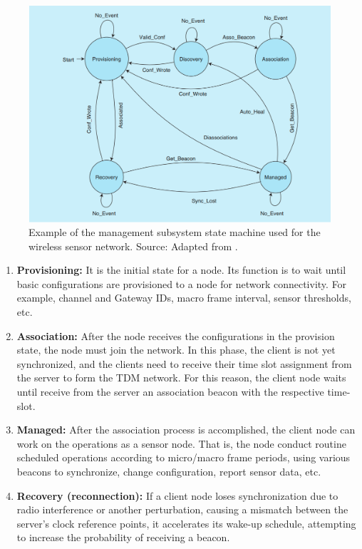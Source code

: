 \documentclass[journal]{IEEEtran}	%
\begin{document}
\begin{figure}[!t]
\centering
\includegraphics[width=0.95\columnwidth]{fig6.png}
\caption{Example of the management subsystem state machine used for the wireless sensor network. Source: Adapted from \cite{williams2017weaving}.}
\label{fig:state_machine}
\end{figure}

\begin{enumerate}
\item \textbf{Provisioning:} It is the initial state for a node. Its function is to wait until basic configurations are provisioned to a node for network connectivity. For example, channel and Gateway IDs, macro frame interval, sensor thresholds, etc.
\item \textbf{Association:} After the node receives the configurations in the provision state, the node must join the network. In this phase, the client is not yet synchronized, and the clients need to receive their time slot assignment from the server to form the TDM network. For this reason, the client node waits until receive from the server an association beacon with the respective time-slot.
\item \textbf{Managed:} After the association process is accomplished, the client node can work on the operations as a sensor node. That is, the node conduct routine scheduled operations according to micro/macro frame periods, using various beacons to synchronize, change configuration, report sensor data, etc.
\item \textbf{Recovery (reconnection):} If a client node loses synchronization due to radio interference or another perturbation, causing a mismatch between the server's clock reference points, it accelerates its wake-up schedule, attempting to increase the probability of receiving a beacon.
\end{enumerate}
\end{document}
